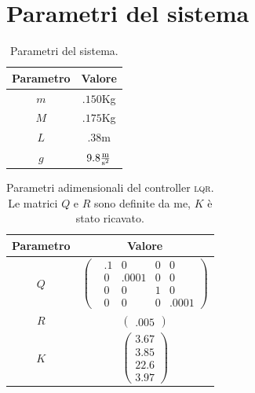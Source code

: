 \appendix
\section{Parametri del sistema}\label{sec:parametri-sistema}
\begin{table}[H]
  \centering
  \begin{tabular}[t]{cc}
    \toprule
    Parametro &Valore\\
    \midrule
    $m$ & $.150$Kg \\
    $M$ & $.175$Kg \\
    $L$ & $.38$m   \\
    $g$ & $9.8\frac {\text m}{\text {s}^2}$ \\
    \bottomrule
  \end{tabular}
  \caption{
    Parametri del sistema.
  }
  \label{tab:parametri-sistema}
\end{table}

\begin{table}[H]
  \centering
  \begin{tabular}[t]{cc}
    \toprule
    Parametro &Valore\\
    \midrule
    \vspace{5px}
    $Q$ & $\left(\begin{matrix}
                   &.1 &0 &0 &0 \\ &0 &.0001 &0 &0 \\ &0 &0 &1 &0 \\ &0 &0 &0 &.0001
    \end{matrix}\right)$ \\
    \vspace{5px}
    $R$ & $\left(\begin{matrix}
                   .005
    \end{matrix}\right)$ \\
    \vspace{5px}
    $K$ & $\left(\begin{matrix}
                   3.67 \\ 3.85 \\ 22.6 \\ 3.97
    \end{matrix}\right)$ \\
    \bottomrule
  \end{tabular}
  \caption{
    Parametri adimensionali del controller \textsc{lqr}. Le matrici $Q$ e $R$ sono definite da me, $K$ è stato ricavato.
  }
  \label{tab:coefficienti-lqr}
\end{table}

